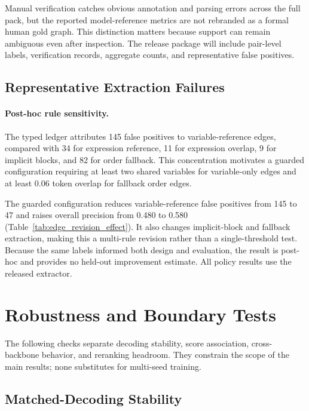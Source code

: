Manual verification catches obvious annotation and parsing errors across the full pack, but the reported model-reference metrics are not rebranded as a formal human gold graph. This distinction matters because support can remain ambiguous even after inspection. The release package will include pair-level labels, verification records, aggregate counts, and representative false positives.

\subsection{Representative Extraction Failures}
\label{app:edge_cases}


\paragraph{Post-hoc rule sensitivity.}
The typed ledger attributes 145 false positives to variable-reference edges, compared with 34 for expression reference, 11 for expression overlap, 9 for implicit blocks, and 82 for order fallback. This concentration motivates a guarded configuration requiring at least two shared variables for variable-only edges and at least 0.06 token overlap for fallback order edges.



The guarded configuration reduces variable-reference false positives from 145 to 47 and raises overall precision from 0.480 to 0.580 (Table~\ref{tab:edge_revision_effect}). It also changes implicit-block and fallback extraction, making this a multi-rule revision rather than a single-threshold test. Because the same labels informed both design and evaluation, the result is post-hoc and provides no held-out improvement estimate. All policy results use the released extractor.

\section{Robustness and Boundary Tests}
\label{app:stress_tests}

The following checks separate decoding stability, score association, cross-backbone behavior, and reranking headroom. They constrain the scope of the main results; none substitutes for multi-seed training.

\subsection{Matched-Decoding Stability}


